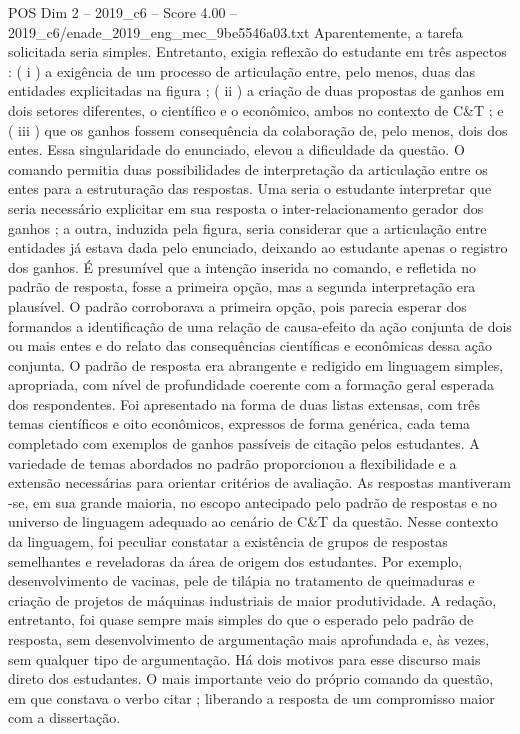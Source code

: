 \begin{textsample}{POS Dim 2 – 2019\_c6 – Score 4.00 – 2019\_c6/enade\_2019\_eng\_mec\_9be5546a03.txt}
Aparentemente, a tarefa solicitada seria simples.
Entretanto, exigia reflexão do estudante em três aspectos : ( i ) a exigência de um processo de articulação entre, pelo menos, duas das entidades explicitadas na figura ; ( ii ) a criação de duas propostas de ganhos em dois setores diferentes, o científico e o econômico, ambos no contexto de C\&T ; e ( iii ) que os ganhos fossem consequência da colaboração de, pelo menos, dois dos entes.
Essa singularidade do enunciado, elevou a dificuldade da questão.
O comando permitia duas possibilidades de interpretação da articulação entre os entes para a estruturação das respostas.
Uma seria o estudante interpretar que seria necessário explicitar em sua resposta o inter-relacionamento gerador dos ganhos ; a outra, induzida pela figura, seria considerar que a articulação entre entidades já estava dada pelo enunciado, deixando ao estudante apenas o registro dos ganhos.
É presumível que a intenção inserida no comando, e refletida no padrão de resposta, fosse a primeira opção, mas a segunda interpretação era plausível.
O padrão corroborava a primeira opção, pois parecia esperar dos formandos a identificação de uma relação de causa-efeito da ação conjunta de dois ou mais entes e do relato das consequências científicas e econômicas dessa ação conjunta.
O padrão de resposta era abrangente e redigido em linguagem simples, apropriada, com nível de profundidade coerente com a formação geral esperada dos respondentes.
Foi apresentado na forma de duas listas extensas, com três temas científicos e oito econômicos, expressos de forma genérica, cada tema completado com exemplos de ganhos passíveis de citação pelos estudantes.
A variedade de temas abordados no padrão proporcionou a flexibilidade e a extensão necessárias para orientar critérios de avaliação.
As respostas mantiveram -se, em sua grande maioria, no escopo antecipado pelo padrão de respostas e no universo de linguagem adequado ao cenário de C\&T da questão.
Nesse contexto da linguagem, foi peculiar constatar a existência de grupos de respostas semelhantes e reveladoras da área de origem dos estudantes.
Por exemplo, desenvolvimento de vacinas, pele de tilápia no tratamento de queimaduras e criação de projetos de máquinas industriais de maior produtividade.
A redação, entretanto, foi quase sempre mais simples do que o esperado pelo padrão de resposta, sem desenvolvimento de argumentação mais aprofundada e, às vezes, sem qualquer tipo de argumentação.
Há dois motivos para esse discurso mais direto dos estudantes.
O mais importante veio do próprio comando da questão, em que constava o verbo citar ; liberando a resposta de um compromisso maior com a dissertação.

\end{textsample}
